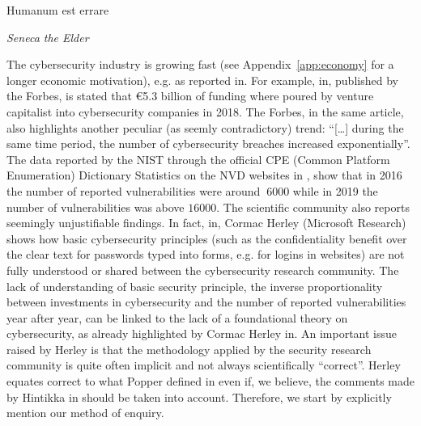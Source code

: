 \epigraph{Humanum est errare}{{\itshape Seneca the Elder}}
The cybersecurity industry is growing fast (see Appendix~\ref{app:economy} for
a longer economic motivation), e.g. as reported in\autocite{Nasdaq2018market}.
For example, in\autocite{Forbes2017market}, published by the Forbes, is stated
that \euro5.3 billion of funding where poured by venture capitalist into
cybersecurity companies in 2018. The Forbes, in the same article, also
highlights another peculiar (as seemly contradictory) trend: ``[\ldots] during
the same time period, the number of cybersecurity breaches increased
exponentially''. The data reported by the NIST through the official CPE (Common
Platform Enumeration) Dictionary Statistics on the NVD websites in
\autocite{NIST2020CPEstatistics}, show that in 2016 the number of reported
vulnerabilities were around $~6000$ while in 2019 the number of
vulnerabilities was above $16000$.  The scientific community also reports
seemingly unjustifiable findings.  In fact, in\autocite{Herley2009so}, Cormac
Herley (Microsoft Research) shows how basic cybersecurity principles (such as
the confidentiality benefit over the clear text for passwords typed into forms,
e.g. for logins in websites) are not fully understood or shared between the
cybersecurity research community\autocite{Nielsen2009stop}.  The lack of
understanding of basic security principle, the inverse proportionality between
investments in cybersecurity and the number of reported vulnerabilities year
after year, can be linked to the lack of a foundational theory on
cybersecurity, as already highlighted by Cormac Herley
in\autocite{Herley2016unfalsifiability}.  An important issue raised by Herley
is that the methodology applied by the security research community is quite
often implicit and not always scientifically ``correct''. Herley equates
correct to what Popper defined in \autocite{popper1962conjectures} even if, we
believe, the comments made by Hintikka in \autocite{Hintikka1993Information}
should be taken into account. Therefore, we start by explicitly mention our method of enquiry. 

